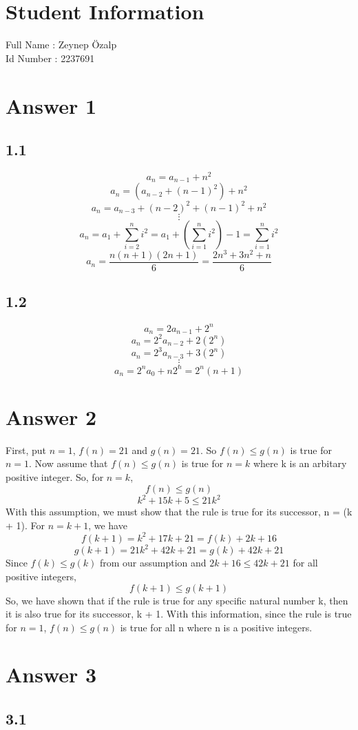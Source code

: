 \documentclass[12pt]{article}
\begin{document}
\section*{Student Information } 
Full Name : Zeynep Özalp \\
Id Number : 2237691 \\

\section*{Answer 1}
\subsection*{1.1}
$$a_n=a_{n-1}+n^2$$
$$a_n=(a_{n-2}+(n-1)^2)+n^2$$
$$a_n=a_{n-3}+(n-2)^2+(n-1)^2+n^2$$
$$\vdots$$
$$a_n=a_1+\sum_{i=2}^n i^2=a_1+(\sum_{i=1}^n i^2)-1=\sum_{i=1}^n i^2$$
$$a_n=\frac{n(n+1)(2n+1)}{6}=\frac{2n^3+3n^2+n}{6}$$

\subsection*{1.2}
$$a_n=2a_{n-1}+2^n$$
$$a_n=2^2a_{n-2}+2(2^n)$$
$$a_n=2^3a_{n-3}+3(2^n)$$
$$\vdots$$
$$a_n=2^na_0+n2^n=2^n(n+1)$$
\section*{Answer 2}
First, put $n=1$, $f(n)=21$ and $g(n)=21$. So $f(n)\leq g(n)$ is true for $n=1$. Now assume that $f(n)\leq g(n)$ is true for $n=k$ where k is an arbitary positive integer. So, for $n=k$,
$$f(n)\leq g(n)$$
$$k^2+15k+5 \leq 21k^2$$
With this assumption, we must show that the rule is true for its successor, n = (k + 1). For $n=k+1$, we have 
$$f(k+1)=k^2+17k+21=f(k)+2k+16$$
$$g(k+1)=21k^2+42k+21=g(k)+42k+21$$
Since $f(k)\leq g(k)$ from our assumption and $2k+16\leq 42k+21$ for all positive integers,
$$f(k+1)\leq g(k+1)$$
So, we have shown that if the rule is true for any specific natural number k, then it is also true for its successor, k + 1. With this information, since the rule is true for $n=1$, $f(n) \leq g(n)$ is true for all n where n is a positive integers. 
\section*{Answer 3}
\subsection*{3.1}
\end{document}
